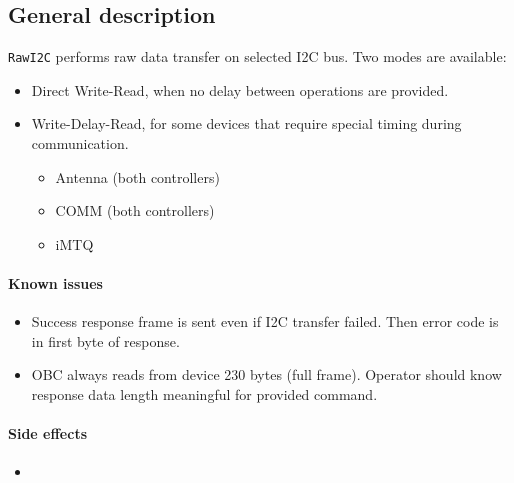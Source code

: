 

\subsection{General description}



\texttt{RawI2C} performs raw data transfer on selected I2C bus.
Two modes are available:
\begin{itemize}
	\item Direct Write-Read, when no delay between operations are provided.
	\item Write-Delay-Read, for some devices that require special timing during communication. 
		\begin{itemize}
			\item Antenna (both controllers)
			\item COMM (both controllers)
			\item iMTQ
		\end{itemize}
\end{itemize}

\paragraph{Known issues}
\begin{itemize}
	\item Success response frame is sent even if I2C transfer failed. Then error code is in first byte of response.
	\item OBC always reads from device 230 bytes (full frame). Operator should know response data length meaningful for provided command.
\end{itemize}

\paragraph{Side effects}
\begin{itemize}
	\item {}
\end{itemize}

